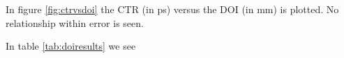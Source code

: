 In figure \ref{fig:ctrvsdoi} the CTR (in ps) versus the DOI (in mm) is plotted. No relationship within error is seen.

In table \ref{tab:doiresults} we see